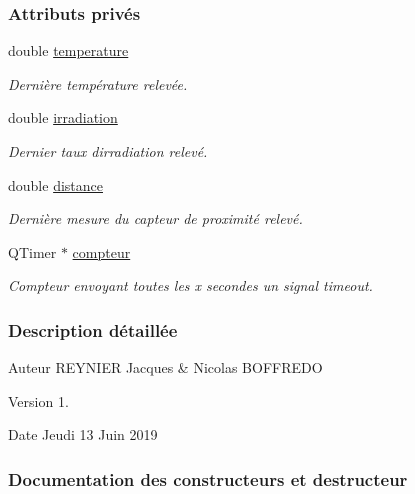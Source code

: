 \subsubsection*{Attributs privés}
\begin{DoxyCompactItemize}
\item 
double \hyperlink{class_mesures_a2688d0da4acf9d91ea0befd6ed0bd140}{temperature}
\begin{DoxyCompactList}\small\item\em Dernière température relevée. \end{DoxyCompactList}\item 
double \hyperlink{class_mesures_a77cde7672dac5e544b7288364ec7c7b5}{irradiation}
\begin{DoxyCompactList}\small\item\em Dernier taux d\textquotesingle{}irradiation relevé. \end{DoxyCompactList}\item 
double \hyperlink{class_mesures_a276f71168b1dcecf2051631d19aa8eeb}{distance}
\begin{DoxyCompactList}\small\item\em Dernière mesure du capteur de proximité relevé. \end{DoxyCompactList}\item 
Q\+Timer $\ast$ \hyperlink{class_mesures_a89af5f279d21cf10f5d6bd58bbc33173}{compteur}
\begin{DoxyCompactList}\small\item\em Compteur envoyant toutes les x secondes un signal timeout. \end{DoxyCompactList}\end{DoxyCompactItemize}


\subsubsection{Description détaillée}
\begin{DoxyAuthor}{Auteur}
R\+E\+Y\+N\+I\+ER Jacques \& Nicolas B\+O\+F\+F\+R\+E\+DO
\end{DoxyAuthor}
\begin{DoxyVersion}{Version}
1.
\end{DoxyVersion}
\begin{DoxyDate}{Date}
Jeudi 13 Juin 2019 
\end{DoxyDate}


\subsubsection{Documentation des constructeurs et destructeur}
\mbox{\label{class_mesures_aa24ed1e055242fab5adab3f8f057c9b1}} 
